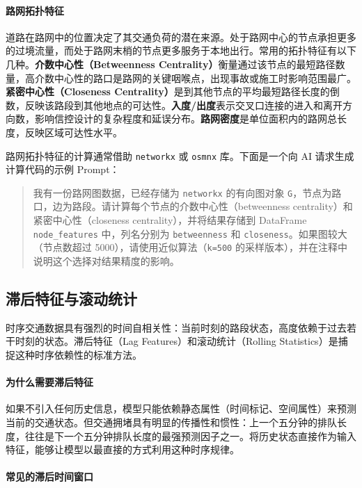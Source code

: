 \paragraph{路网拓扑特征}

道路在路网中的位置决定了其交通负荷的潜在来源。处于路网中心的节点承担更多的过境流量，而处于路网末梢的节点更多服务于本地出行。常用的拓扑特征有以下几种。\textbf{介数中心性（Betweenness Centrality）}衡量通过该节点的最短路径数量，高介数中心性的路口是路网的关键咽喉点，出现事故或施工时影响范围最广。\textbf{紧密中心性（Closeness Centrality）}是到其他节点的平均最短路径长度的倒数，反映该路段到其他地点的可达性。\textbf{入度/出度}表示交叉口连接的进入和离开方向数，影响信控设计的复杂程度和延误分布。\textbf{路网密度}是单位面积内的路网总长度，反映区域可达性水平。

路网拓扑特征的计算通常借助 \texttt{networkx} 或 \texttt{osmnx} 库。下面是一个向 AI 请求生成计算代码的示例 Prompt：

\begin{quote}
我有一份路网图数据，已经存储为 \texttt{networkx} 的有向图对象 \texttt{G}，节点为路口，边为路段。请计算每个节点的介数中心性（betweenness centrality）和紧密中心性（closeness centrality），并将结果存储到 DataFrame \texttt{node\_features} 中，列名分别为 \texttt{betweenness} 和 \texttt{closeness}。如果图较大（节点数超过 5000），请使用近似算法（\texttt{k=500} 的采样版本），并在注释中说明这个选择对结果精度的影响。
\end{quote}

\subsection{滞后特征与滚动统计}

时序交通数据具有强烈的时间自相关性：当前时刻的路段状态，高度依赖于过去若干时刻的状态。滞后特征（Lag Features）和滚动统计（Rolling Statistics）是捕捉这种时序依赖性的标准方法。

\paragraph{为什么需要滞后特征}

如果不引入任何历史信息，模型只能依赖静态属性（时间标记、空间属性）来预测当前的交通状态。但交通拥堵具有明显的传播性和惯性：上一个五分钟的排队长度，往往是下一个五分钟排队长度的最强预测因子之一。将历史状态直接作为输入特征，能够让模型以最直接的方式利用这种时序规律。

\paragraph{常见的滞后时间窗口}

